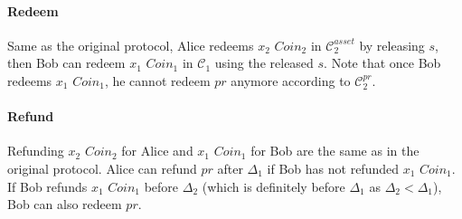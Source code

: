 \paragraph{Redeem}
Same as the original protocol, Alice redeems $x_2$ $Coin_2$ in $\mathcal{C}^{asset}_2$ by releasing $s$, then Bob can redeem  $x_1$ $Coin_1$ in $\mathcal{C}_1$ using the released $s$.
Note that once Bob redeems $x_1$ $Coin_1$, he cannot redeem $pr$ anymore according to $\mathcal{C}^{pr}_2$.

\paragraph{Refund}
Refunding $x_2$ $Coin_2$ for Alice and $x_1$ $Coin_1$ for Bob are the same as in the original protocol.
Alice can refund $pr$ after $\Delta_1$ if Bob has not refunded $x_1$ $Coin_1$.
If Bob refunds $x_1$ $Coin_1$ before $\Delta_2$ (which is definitely before $\Delta_1$ as $\Delta_2 < \Delta_1$), Bob can also redeem $pr$.

